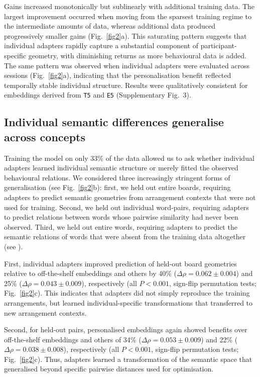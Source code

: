 \documentclass[pdflatex,sn-mathphys]{sn-jnl}
\begin{document}
Gains increased monotonically but sublinearly with additional training data. The largest improvement occurred when moving from the sparsest training regime to the intermediate amounts of data, whereas additional data produced progressively smaller gains (Fig.~\ref{fig2}a). This saturating pattern suggests that individual adapters rapidly capture a substantial component of participant-specific geometry, with diminishing returns as more behavioural data is added. The same pattern was observed when individual adapters were evaluated across sessions (Fig.~\ref{fig2}a), indicating that the personalisation benefit reflected temporally stable individual structure. Results were qualitatively consistent for embeddings derived from \texttt{T5} and \texttt{E5} (Supplementary Fig.~3). 

\subsection{Individual semantic differences generalise across concepts}
Training the model on only 33\% of the data allowed us to ask whether individual adapters learned individual semantic structure or merely fitted the observed behavioural relations. We considered three increasingly stringent forms of generalisation (see Fig.~\ref{fig2}b): first, we held out entire boards, requiring adapters to predict semantic geometries from arrangement contexts that were not used for training. Second, we held out individual word-pairs, requiring adapters to predict relations between words whose pairwise similarity had never been observed. Third, we held out entire words, requiring adapters to predict the semantic relations of words that were absent from the training data altogether (see ).

First, individual adapters improved prediction of held-out board geometries relative to off-the-shelf embeddings and others by 40\% ($\Delta\rho = 0.062\pm0.004$) and 25\% ($\Delta\rho = 0.043\pm0.009$), respectively (all $P < 0.001$, sign-flip permutation tests; Fig.~\ref{fig2}c). This indicates that adapters did not simply reproduce the training arrangements, but learned individual-specific transformations that transferred to new arrangement contexts.

Second, for held-out pairs, personalised embeddings again showed benefits over off-the-shelf embeddings and others of 34\% ($\Delta\rho = 0.053\pm0.009$) and 22\% ($\Delta\rho = 0.038\pm0.008$), respectively (all $P < 0.001$, sign-flip permutation tests; Fig.~\ref{fig2}c). Thus, adapters learned a transformation of the semantic space that generalised beyond specific pairwise distances used for optimisation.
\end{document}
